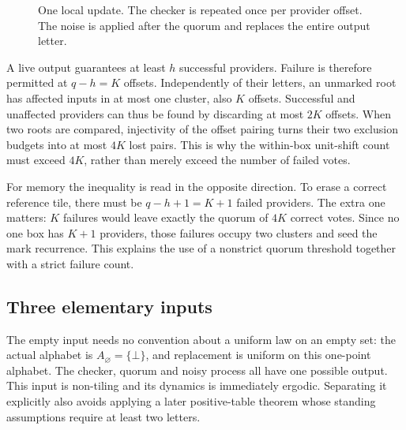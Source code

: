 \begin{figure}[ht]
\centering
{}
\caption{One local update. The checker is repeated once per provider offset. The noise is applied after the quorum and replaces the entire output letter.}
\end{figure}

A live output guarantees at least $h$ successful providers. Failure is therefore permitted at $q-h=K$ offsets. Independently of their letters, an unmarked root has affected inputs in at most one cluster, also $K$ offsets. Successful and unaffected providers can thus be found by discarding at most $2K$ offsets. When two roots are compared, injectivity of the offset pairing turns their two exclusion budgets into at most $4K$ lost pairs. This is why the within-box unit-shift count must exceed $4K$, rather than merely exceed the number of failed votes.

For memory the inequality is read in the opposite direction. To erase a correct reference tile, there must be $q-h+1=K+1$ failed providers. The extra one matters: $K$ failures would leave exactly the quorum of $4K$ correct votes. Since no one box has $K+1$ providers, those failures occupy two clusters and seed the mark recurrence. This explains the use of a nonstrict quorum threshold together with a strict failure count.
\subsection{Three elementary inputs}

The empty input needs no convention about a uniform law on an empty set: the actual alphabet is $A_\varnothing=\{\bot\}$, and replacement is uniform on this one-point alphabet. The checker, quorum and noisy process all have one possible output. This input is non-tiling and its dynamics is immediately ergodic. Separating it explicitly also avoids applying a later positive-table theorem whose standing assumptions require at least two letters.

